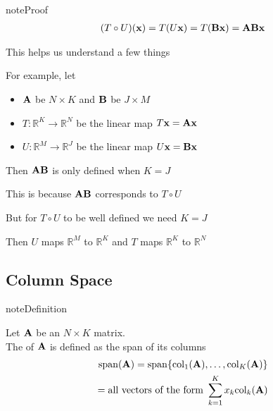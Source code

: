 \documentclass[letterpaper,10pt,english]{jupyterBook}
\begin{document}
\begin{sphinxadmonition}{note}{Proof}
\begin{equation*}
\begin{split}
%
(T \circ U) ({\bf x})
= T( U{\bf x})
= T( {\bf B} {\bf x})
= {\bf A} {\bf B} {\bf x}
%
\end{split}
\end{equation*}\end{sphinxadmonition}

\sphinxAtStartPar
This helps us understand a few things

\sphinxAtStartPar
For example, let
\begin{itemize}
\item {} 
\sphinxAtStartPar
\({\bf A}\) be \(N \times K\) and \({\bf B}\) be \(J \times M\)

\item {} 
\sphinxAtStartPar
\(T \colon \mathbb{R}^K \to \mathbb{R}^N\) be the linear map \(T{\bf x} = {\bf A}{\bf x}\)

\item {} 
\sphinxAtStartPar
\(U \colon \mathbb{R}^M \to \mathbb{R}^J\) be the linear map \(U{\bf x} = {\bf B}{\bf x}\)

\end{itemize}

\sphinxAtStartPar
Then \({\bf A} {\bf B}\) is only defined when \(K = J\)

\sphinxAtStartPar
This is because \({\bf A} {\bf B}\) corresponds to \(T \circ U\)

\sphinxAtStartPar
But for \(T \circ U\) to be well defined we need \(K = J\)

\sphinxAtStartPar
Then \(U\) maps \(\mathbb{R}^M\) to \(\mathbb{R}^K\) and \(T\) maps \(\mathbb{R}^K\) to \(\mathbb{R}^N\)


\subsection{Column Space}
\label{\detokenize{05.linear_algebra:column-space}}
\begin{sphinxadmonition}{note}{Definition}

\sphinxAtStartPar
Let \({\bf A}\) be an \(N \times K\) matrix. \\
The  of \({\bf A}\) is defined as the span of its columns
\begin{equation*}
\begin{split}
%
\mathrm{span}({\bf A}) 
= \mathrm{span} \{ \mathrm{col}_1 ({\bf A}), \ldots, \mathrm{col}_K({\bf A}) \}
\\
= \text{all vectors of the form } \sum_{k=1}^K x_k \mathrm{col}_k({\bf A})
%
\end{split}
\end{equation*}\end{sphinxadmonition}
\end{document}
